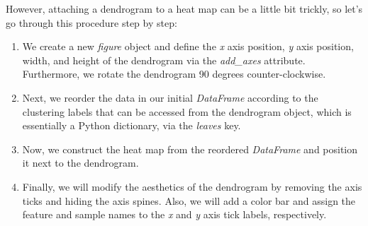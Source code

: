 \documentclass[11pt]{article}
\providecommand{\tightlist}{%
      \setlength{\itemsep}{0pt}\setlength{\parskip}{0pt}}
\begin{document}
However, attaching a dendrogram to a heat map can be a little bit
trickly, so let's go through this procedure step by step:

\begin{enumerate}
\def\labelenumi{\arabic{enumi}.}
\tightlist
\item
  We create a new \emph{figure} object and define the \emph{x} axis
  position, \emph{y} axis position, width, and height of the dendrogram
  via the \emph{add\_axes} attribute. Furthermore, we rotate the
  dendrogram 90 degrees counter-clockwise.
\item
  Next, we reorder the data in our initial \emph{DataFrame} according to
  the clustering labels that can be accessed from the dendrogram object,
  which is essentially a Python dictionary, via the \emph{leaves} key.
\item
  Now, we construct the heat map from the reordered \emph{DataFrame} and
  position it next to the dendrogram.
\item
  Finally, we will modify the aesthetics of the dendrogram by removing
  the axis ticks and hiding the axis spines. Also, we will add a color
  bar and assign the feature and sample names to the \emph{x} and
  \emph{y} axis tick labels, respectively.
\end{enumerate}
\end{document}
